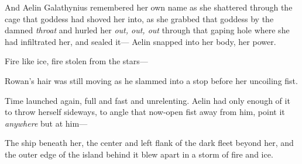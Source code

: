 And Aelin Galathynius remembered her own name as she shattered through the cage that goddess had shoved her into, as she grabbed that goddess by the damned \emph{throat} and hurled her \emph{out, out, out} through that gaping hole where she had infiltrated her, and sealed it--- Aelin snapped into her body, her power.

Fire like ice, fire stolen from the stars---

Rowan's hair was still moving as he slammed into a stop before her uncoiling fist.

Time launched again, full and fast and unrelenting.
Aelin had only enough of it to throw herself sideways, to angle that now-open fist away from him, point it \emph{anywhere} but at him---

The ship beneath her, the center and left flank of the dark fleet beyond her, and the outer edge of the island behind it blew apart in a storm of fire and ice.
